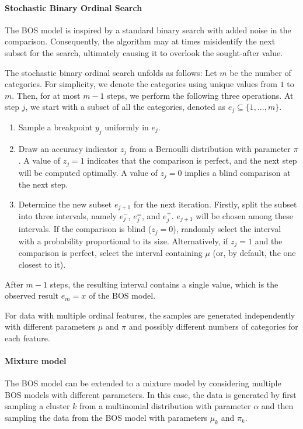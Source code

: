 \paragraph{Stochastic Binary Ordinal Search} The BOS model is inspired by a standard binary search with added noise in the comparison. Consequently, the algorithm may at times misidentify the next subset for the search, ultimately causing it to overlook the sought-after value.

The stochastic binary ordinal search unfolds as follows: Let $m$ be the number of categories. For simplicity, we denote the categories using unique values from $1$ to $m$. Then, for at most $m-1$ steps, we perform the following three operations. At step $j$, we start with a subset of all the categories, denoted as $e_j\subseteq \{1,...,m\}$.

\begin{enumerate}
    \item Sample a breakpoint $y_j$ uniformly in $e_j$.
    \item Draw an accuracy indicator $z_j$ from a Bernoulli distribution with parameter $\pi$. A value of $z_j=1$ indicates that the comparison is perfect, and the next step will be computed optimally. A value of $z_j=0$ implies a blind comparison at the next step.
    \item Determine the new subset $e_{j+1}$ for the next iteration. Firstly, split the subset into three intervals, namely $e_j^-$, $e_j^=$, and $e_j^+$. $e_{j+1}$ will be chosen among these intervals. If the comparison is blind ($z_j=0$), randomly select the interval with a probability proportional to its size. Alternatively, if $z_j=1$ and the comparison is perfect, select the interval containing $\mu$ (or, by default, the one closest to it).
\end{enumerate}
After $m-1$ steps, the resulting interval contains a single value, which is the observed result $e_m={x}$ of the BOS model.

For data with multiple ordinal features, the samples are generated independently with different parameters $\mu$ and $\pi$ and possibly different numbers of categories for each feature.

\paragraph{Mixture model} 
The BOS model can be extended to a mixture model by considering multiple BOS models with different parameters. In this case, the data is generated by first sampling a cluster $k$ from a multinomial distribution with parameter $\alpha$ and then sampling the data from the BOS model with parameters $\mu_k$ and $\pi_k$.

